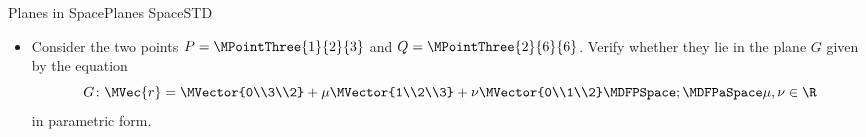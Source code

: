 \begin{MXContent}{Planes in Space}{Planes Space}{STD}
\begin{MExample}
\begin{itemize}
  One of these three points, for example the point $A$, is used as the reference point.
  $\MDVec{A}=\MVector{1\\0\\-2}$ is the corresponding reference vector. The connecting vectors from the reference point 
  to the two other points are used as the direction vectors:
 \[
  \MDVec{A B} = \MDVec{B}-\MDVec{A}=\MVector{4\\1\\2}-\MVector{1\\0\\-2}=\MVector{3\\1\\4}\MDFPSpace,
 \]
 \[
  \MDVec{A C} = \MDVec{C}-\MDVec{A}=\MVector{0\\2\\1}-\MVector{1\\0\\-2}=\MVector{-1\\2\\3}\MDFPeriod
 \]
 Hence, the equation 
 \[
  F\colon\MVec{r}=\MVector{1\\0\\-2}+\rho\MVector{3\\1\\4}+\sigma\MVector{-1\\2\\3}\MDFPSpace;\MDFPaSpace\rho,\sigma\in\R
 \]
  is a correct representation of the plane $F$ in parametric form. 
  
 (This figure will be released shortly.)
 
 \item Consider the two points $P=\MPointThree{1}{2}{3}$ and $Q=\MPointThree{2}{6}{6}$. Verify whether they lie 
  in the plane $G$ given by the equation 
 \[
  G\colon\MVec{r}=\MVector{0\\3\\2}+\mu\MVector{1\\2\\3}+\nu\MVector{0\\1\\2}\MDFPSpace;\MDFPaSpace\mu,\nu\in\R
 \]
 in parametric form.


\end{itemize}
\end{MExample}
\end{MXContent}
